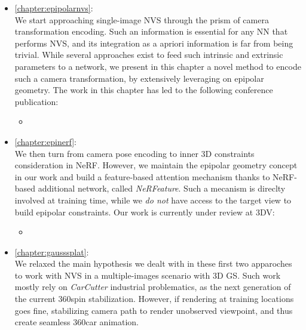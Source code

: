 \begin{itemize}
      \item \autoref{chapter:epipolarnvs}: \\
            We start approaching single-image \ac{NVS} through the prism of camera transformation encoding. Such an information is essential for any \ac{NN} that performs \ac{NVS}, and its integration as a apriori information is far from being trivial. While several approaches exist to feed such intrinsic and extrinsic parameters to a network, we present in this chapter a novel method to encode such a camera transformation, by extensively leveraging on epipolar geometry. The work in this chapter has led to the following conference publication:
            \begin{itemize}
                \item {}
            \end{itemize}


      \item \autoref{chapter:epinerf}: \\
            We then turn from camera pose encoding to inner 3D constraints consideration in \ac{NeRF}. However, we maintain the epipolar geometry concept in our work and build a feature-based attention mechanism thanks to \ac{NeRF}-based additional network, called \textit{NeRFeature}. Such a mecanism is direclty involved at training time, while we \textit{do not} have access to the target view to build epipolar constraints. Our work is currently under review at 3DV:
            \begin{itemize}
                  \item {}
            \end{itemize}

      \item \autoref{chapter:gausssplat}: \\
            We relaxed the main hypothesis we dealt with in these first two apparoches to work with \ac{NVS} in a multiple-images scenario with 3D \ac{GS}. Such work mostly rely on \textit{CarCutter} 
industrial problematics, as the next generation of the current 360\degree spin stabilization. However, if rendering at training locations goes fine, stabilizing camera path to render unobserved viewpoint, and thus create seamless 360\degree car animation. 


\end{itemize}
